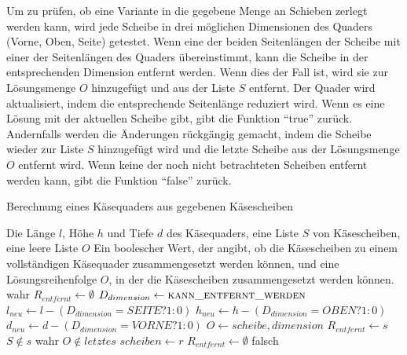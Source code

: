 \documentclass[a4paper,10pt,ngerman]{scrartcl}
\begin{document}
    Um zu prüfen, ob eine Variante in die gegebene Menge an Schieben zerlegt werden kann, wird jede
    Scheibe in drei möglichen Dimensionen des Quaders (Vorne, Oben, Seite) getestet.
    Wenn eine der beiden Seitenlängen der Scheibe mit einer der Seitenlängen des Quaders übereinstimmt,
    kann die Scheibe in der entsprechenden Dimension entfernt werden.
    Wenn dies der Fall ist, wird sie zur Lösungsmenge $O$ hinzugefügt und aus der Liste $S$ entfernt.
    Der Quader wird aktualisiert, indem die entsprechende Seitenlänge reduziert wird.
    Wenn es eine Lösung mit der aktuellen Scheibe gibt, gibt die Funktion ``true'' zurück.
    Andernfalls werden die Änderungen rückgängig gemacht, indem die Scheibe wieder zur Liste $S$ hinzugefügt wird
    und die letzte Scheibe aus der Lösungsmenge $O$ entfernt wird.
    Wenn keine der noch nicht betrachteten Scheiben entfernt werden kann, gibt die Funktion ``false'' zurück.

    \begin{algorithm}[H]
        \caption{Berechnung eines Käsequaders aus gegebenen Käsescheiben}
        \begin{algorithmic}
            \Require Die Länge $l$, Höhe $h$ und Tiefe $d$ des Käsequaders, eine Liste $S$ von Käsescheiben, eine leere Liste $O$
            \Ensure Ein boolescher Wert, der angibt, ob die Käsescheiben zu einem vollständigen Käsequader zusammengesetzt werden können,
            und eine Lösungsreihenfolge $O$, in der die Käsescheiben zusammengesetzt werden können.
                    \State \Return wahr
                \EndIf
                \State $R_{entfernt} \gets \emptyset$
                    \State $D_{dimension} \gets \textsc{kann\_entfernt\_werden}$
                        \State $l_{neu} \gets l - (D_{dimension} = SEITE ? 1 : 0)$
                        \State $h_{neu}  \gets h - (D_{dimension} = OBEN ? 1 : 0)$
                        \State $d_{neu}  \gets d - (D_{dimension} = VORNE ? 1 : 0)$
                        \State $O \gets {scheibe, dimension}$
                        \State $R_{entfernt} \gets s$
                        \State $S \notin s$
                    \EndIf
                        \State \Return wahr
                    \Else
                        \State $O \notin letztes$
                            \State $scheiben \gets r$
                        \EndFor
                        \State $R_{entfernt} \gets \emptyset$
                        \EndElse
                    \EndIf
                \EndFor
                \State \Return falsch
            \EndFunction
        \end{algorithmic}\label{alg:pseudo_greedy}
    \end{algorithm}
\end{document}
